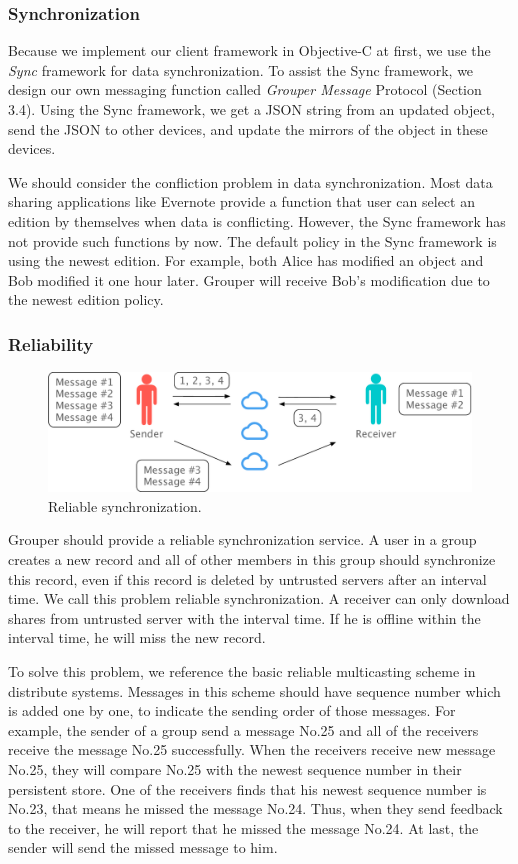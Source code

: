 \documentclass[twocolumn,10pt]{article}
\begin{document}
\subsubsection{Synchronization}

Because we implement our client framework in Objective-C at first, we use the \emph{Sync} framework\cite{sync} for data synchronization.
To assist the Sync framework, we design our own messaging function called \emph{Grouper Message} Protocol (Section 3.4).
Using the Sync framework, we get a JSON string from an updated object, send the JSON to other devices, and update the mirrors of the object in these devices. 

We should consider the confliction problem in data synchronization. Most data sharing applications like Evernote provide a function that user can select an edition by themselves when data is conflicting. However, the Sync framework has not provide such functions by now. The default policy in the Sync framework is using the newest edition. For example, both Alice has modified an object and Bob modified it one hour later. Grouper will receive Bob's modification due to the newest edition policy. 

\subsubsection{Reliability}

\begin{figure}[t]
	\centering
	\includegraphics[scale=0.32]{reliable_sync}
	\caption{Reliable synchronization.}
\end{figure}

Grouper should provide a reliable synchronization service. 
A user in a group creates a new record and all of other members in this group should synchronize this record, even if this record is deleted by untrusted servers after an interval time. 
We call this problem reliable synchronization. 
A receiver can only download shares from untrusted server with the interval time. 
If he is offline within the interval time, he will miss the new record.

To solve this problem, we reference the basic reliable multicasting scheme in distribute systems. 
Messages in this scheme should have sequence number which is added one by one, to indicate the sending order of those messages. 
For example, the sender of a group send a message No.25 and all of the receivers receive the message No.25 successfully. 
When the receivers receive new message No.25, they will compare No.25 with the newest sequence number in their persistent store. 
One of the receivers finds that his newest sequence number is No.23, that means he missed the message No.24. 
Thus, when they send feedback to the receiver, he will report that he missed the message No.24. 
At last, the sender will send the missed message to him.
\end{document}
